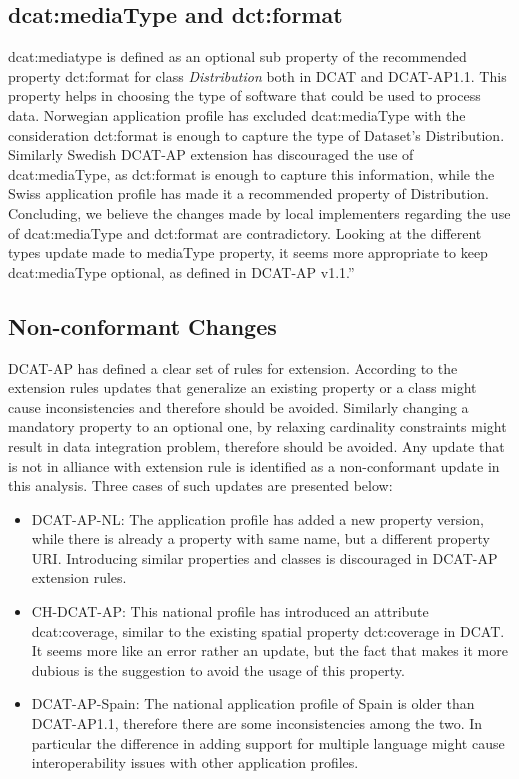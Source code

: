 \documentclass[<options>]{elsarticle}
\begin{document}
\subsection{dcat:mediaType and dct:format}
dcat:mediatype is defined as an optional sub property of the recommended property dct:format for class \textit{Distribution} both in DCAT and DCAT-AP1.1. This property helps in choosing the type of software that could be used to process data. Norwegian application profile has excluded dcat:mediaType with the consideration dct:format is enough to capture the type of Dataset’s Distribution. Similarly Swedish DCAT-AP extension has discouraged the use of dcat:mediaType, as dct:format is enough to capture this information, while the Swiss application profile has made it a recommended property of Distribution. Concluding, we believe the changes made by local implementers regarding the use of dcat:mediaType and dct:format are contradictory. Looking at the different types update made to mediaType property, it seems more appropriate to keep dcat:mediaType optional, as defined in DCAT-AP v1.1.”

\subsection{Non-conformant Changes}
DCAT-AP has defined a clear set of rules for extension. According to the extension rules updates that generalize an existing property or a class might cause inconsistencies and therefore should be avoided. Similarly changing a mandatory property to an optional one, by relaxing cardinality constraints might result in data integration problem, therefore should be avoided. Any update that is not in alliance with extension rule is identified as a non-conformant update in this analysis. Three cases of such updates are presented below:

\begin{itemize}
\item DCAT-AP-NL: The application profile has added a new property version, while there is already a property with same name, but a different property URI. Introducing similar properties and classes is discouraged in DCAT-AP extension rules.
\item CH-DCAT-AP: This national profile has introduced an attribute dcat:coverage, similar to the existing spatial property dct:coverage in DCAT. It seems more like an error rather an update, but the fact that makes it more dubious is the suggestion to avoid the usage of this property.   
\item DCAT-AP-Spain: The national application profile of Spain is older than DCAT-AP1.1, therefore there are some inconsistencies among the two. In particular the difference in adding support for multiple language might cause interoperability issues with other application profiles. 
\end{itemize}
\end{document}
